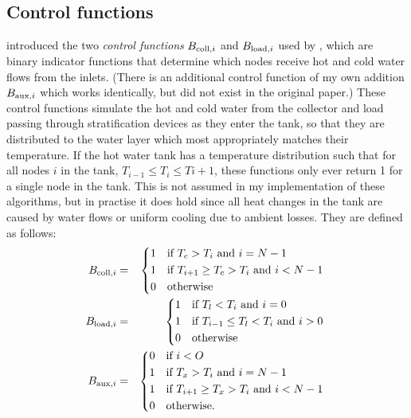 \subsection{Control functions}

 introduced the two \emph{control functions} $B_{\text{coll}, i}$ and $B_{\text{load}, i}$ used by , which are binary indicator functions that determine which nodes receive hot and cold water flows from the inlets.
(There is an additional control function of my own addition $B_{\text{aux}, i}$ which works identically, but did not exist in the original paper.)
These control functions simulate the hot and cold water from the collector and load passing through stratification devices as they enter the tank, so that they are distributed to the water layer which most appropriately matches their temperature.
If the hot water tank has a temperature distribution such that for all nodes $i$ in the tank, $T_{i-1} \le T_i \le T{i+1}$, these functions only ever return 1 for a single node in the tank.
This is not assumed in my implementation of these algorithms, but in practise it does hold since all heat changes in the tank are caused by water flows or uniform cooling due to ambient losses.
They are defined as follows:
\begin{eqnarray}
   \label{eq:B-coll}
   \B{coll} &=& \begin{dcases*}
      1 & if $T_c > T_i$ and $i = N-1$ \\
      1 & if $T_{i+1} \ge T_c > T_i$ and $i < N-1$ \\
      0 & otherwise
   \end{dcases*}
   \\
   \label{eq:B-load}
   \B{load} &=& \begin{dcases*}
      1 & if $T_l < T_i$ and $i = 0$ \\
      1 & if $T_{i-1} \le T_l < T_i$ and $i > 0$ \\
      0 & otherwise
   \end{dcases*}
   \\
   \label{eq:B-aux}
   \B{aux} &=& \begin{dcases*}
      0 & if $i < O$ \\
      1 & if $T_x > T_i$ and $i = N-1$ \\
      1 & if $T_{i+1} \ge T_x > T_i$ and $i < N-1$ \\
      0 & otherwise.
   \end{dcases*}
\end{eqnarray}

